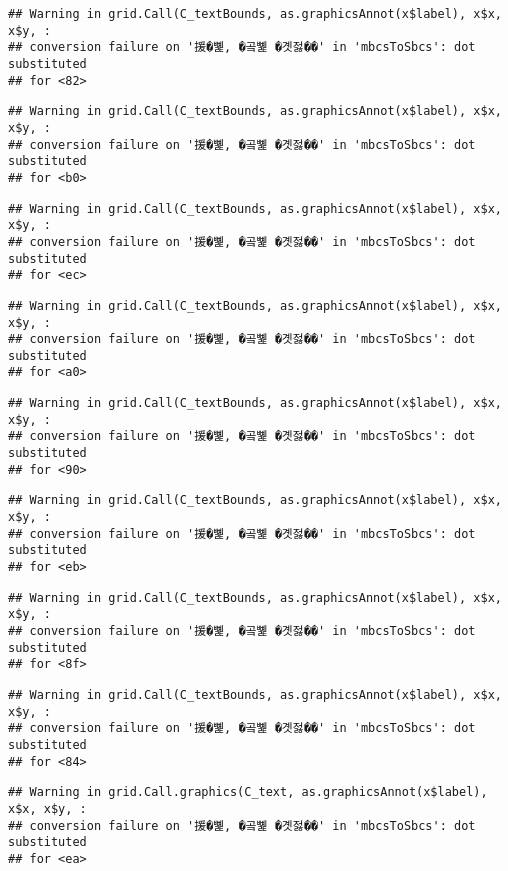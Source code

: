 \documentclass[
]{article}
\begin{document}
\begin{verbatim}
## Warning in grid.Call(C_textBounds, as.graphicsAnnot(x$label), x$x, x$y, :
## conversion failure on '援�뼱, �곸뼱 �곗젏��' in 'mbcsToSbcs': dot substituted
## for <82>
\end{verbatim}

\begin{verbatim}
## Warning in grid.Call(C_textBounds, as.graphicsAnnot(x$label), x$x, x$y, :
## conversion failure on '援�뼱, �곸뼱 �곗젏��' in 'mbcsToSbcs': dot substituted
## for <b0>
\end{verbatim}

\begin{verbatim}
## Warning in grid.Call(C_textBounds, as.graphicsAnnot(x$label), x$x, x$y, :
## conversion failure on '援�뼱, �곸뼱 �곗젏��' in 'mbcsToSbcs': dot substituted
## for <ec>
\end{verbatim}

\begin{verbatim}
## Warning in grid.Call(C_textBounds, as.graphicsAnnot(x$label), x$x, x$y, :
## conversion failure on '援�뼱, �곸뼱 �곗젏��' in 'mbcsToSbcs': dot substituted
## for <a0>
\end{verbatim}

\begin{verbatim}
## Warning in grid.Call(C_textBounds, as.graphicsAnnot(x$label), x$x, x$y, :
## conversion failure on '援�뼱, �곸뼱 �곗젏��' in 'mbcsToSbcs': dot substituted
## for <90>
\end{verbatim}

\begin{verbatim}
## Warning in grid.Call(C_textBounds, as.graphicsAnnot(x$label), x$x, x$y, :
## conversion failure on '援�뼱, �곸뼱 �곗젏��' in 'mbcsToSbcs': dot substituted
## for <eb>
\end{verbatim}

\begin{verbatim}
## Warning in grid.Call(C_textBounds, as.graphicsAnnot(x$label), x$x, x$y, :
## conversion failure on '援�뼱, �곸뼱 �곗젏��' in 'mbcsToSbcs': dot substituted
## for <8f>
\end{verbatim}

\begin{verbatim}
## Warning in grid.Call(C_textBounds, as.graphicsAnnot(x$label), x$x, x$y, :
## conversion failure on '援�뼱, �곸뼱 �곗젏��' in 'mbcsToSbcs': dot substituted
## for <84>
\end{verbatim}

\begin{verbatim}
## Warning in grid.Call.graphics(C_text, as.graphicsAnnot(x$label), x$x, x$y, :
## conversion failure on '援�뼱, �곸뼱 �곗젏��' in 'mbcsToSbcs': dot substituted
## for <ea>
\end{verbatim}
\end{document}
